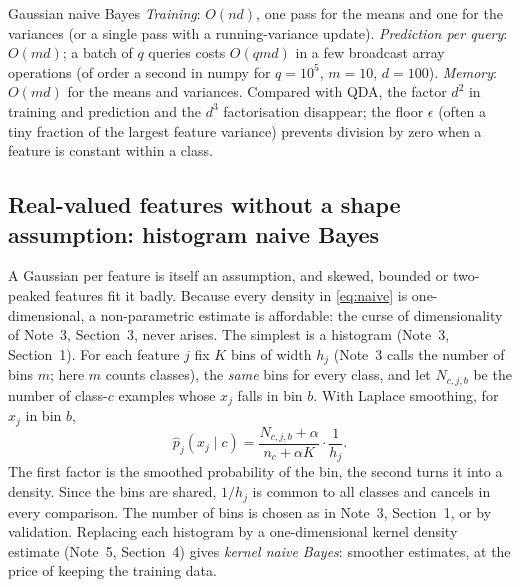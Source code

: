 \documentclass[11pt]{article}
\begin{document}
\begin{runtime}{Gaussian naive Bayes}
\emph{Training}: $O(nd)$, one pass for the means and one for the variances (or a single pass with a running-variance
update). \emph{Prediction per query}: $O(md)$; a batch of $q$ queries costs $O(qmd)$ in a few broadcast array
operations (of order a second in numpy for $q = 10^5$, $m = 10$, $d = 100$). \emph{Memory}: $O(md)$ for the means and variances. Compared with QDA,
the factor $d^2$ in training and prediction and the $d^3$ factorisation disappear; the floor $\epsilon$ (often a tiny
fraction of the largest feature variance) prevents division by zero when a feature is constant within a class.
\end{runtime}

\subsection{Real-valued features without a shape assumption: histogram naive Bayes}\label{sec:histnb}

A Gaussian per feature is itself an assumption, and skewed, bounded or two-peaked features fit it badly. Because
every density in \eqref{eq:naive} is one-dimensional, a non-parametric estimate is affordable: the curse of
dimensionality of Note~3, Section~3, never arises. The simplest is a histogram (Note~3, Section~1). For each feature
$j$ fix $K$ bins of width $h_j$ (Note~3 calls the number of bins $m$; here $m$ counts classes), the \emph{same} bins for every class, and let $N_{c,j,b}$ be the number of class-$c$
examples whose $x_j$ falls in bin $b$. With Laplace smoothing, for $x_j$ in bin $b$,
\begin{equation}\label{eq:histnb}
  \hat p_j(x_j \mid c) = \frac{N_{c,j,b} + \alpha}{n_c + \alpha K} \cdot \frac{1}{h_j} .
\end{equation}
The first factor is the smoothed probability of the bin, the second turns it into a density. Since the bins are shared,
$1/h_j$ is common to all classes and cancels in every comparison. The number of bins is chosen as in Note~3, Section~1,
or by validation. Replacing each histogram by a one-dimensional kernel density estimate (Note~5, Section~4) gives
\emph{kernel naive Bayes}: smoother estimates, at the price of keeping the training data.
\end{document}
